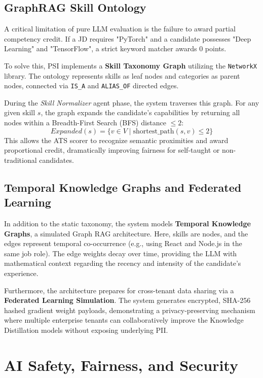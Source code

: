 \documentclass[10pt,journal,compsoc]{IEEEtran}
\begin{document}
\subsection{GraphRAG Skill Ontology}
A critical limitation of pure LLM evaluation is the failure to award partial competency credit. If a JD requires "PyTorch" and a candidate possesses "Deep Learning" and "TensorFlow", a strict keyword matcher awards 0 points.

To solve this, PSI implements a \textbf{Skill Taxonomy Graph} utilizing the \texttt{NetworkX} library. The ontology represents skills as leaf nodes and categories as parent nodes, connected via \texttt{IS\_A} and \texttt{ALIAS\_OF} directed edges. 

During the \textit{Skill Normalizer} agent phase, the system traverses this graph. For any given skill $s$, the graph expands the candidate's capabilities by returning all nodes within a Breadth-First Search (BFS) distance $\leq 2$:
\begin{equation}
    Expanded(s) = \{v \in V \mid \text{shortest\_path}(s, v) \leq 2\}
\end{equation}
This allows the ATS scorer to recognize semantic proximities and award proportional credit, dramatically improving fairness for self-taught or non-traditional candidates.

\subsection{Temporal Knowledge Graphs and Federated Learning}
In addition to the static taxonomy, the system models \textbf{Temporal Knowledge Graphs}, a simulated Graph RAG architecture. Here, skills are nodes, and the edges represent temporal co-occurrence (e.g., using React and Node.js in the same job role). The edge weights decay over time, providing the LLM with mathematical context regarding the recency and intensity of the candidate's experience.

Furthermore, the architecture prepares for cross-tenant data sharing via a \textbf{Federated Learning Simulation}. The system generates encrypted, SHA-256 hashed gradient weight payloads, demonstrating a privacy-preserving mechanism where multiple enterprise tenants can collaboratively improve the Knowledge Distillation models without exposing underlying PII.


\section{AI Safety, Fairness, and Security}\label{sec:safety}
\end{document}
